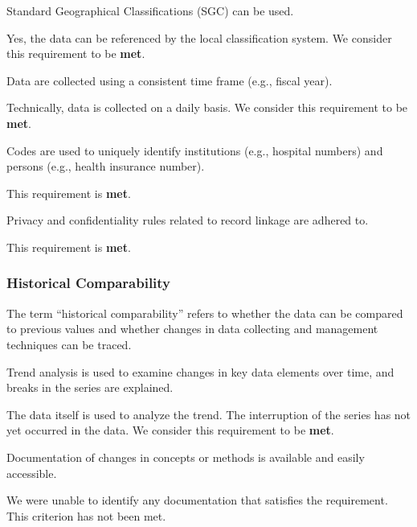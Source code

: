 \begin{QandA}
    \item Standard Geographical Classifications (SGC) can be used.
    \begin{answered}
        Yes, the data can be referenced by the local classification system.
        We consider this requirement to be \textbf{met}.
    \end{answered}

    \item Data are collected using a consistent time frame (e.g., fiscal year).
    \begin{answered}
        Technically, data is collected on a daily basis.
        We consider this requirement to be \textbf{met}.
    \end{answered}

    \item Codes are used to uniquely identify institutions (e.g., hospital numbers) and persons (e.g., health insurance number).
    \begin{answered}
        This requirement is \textbf{met}.
    \end{answered}

    \item Privacy and confidentiality rules related to record linkage are adhered to.
    \begin{answered}
        This requirement is \textbf{met}.
    \end{answered}

\end{QandA}

\subsubsection{Historical Comparability}

The term \enquote{historical comparability} refers to whether the data can be compared to previous values and whether changes in data collecting and management techniques can be traced.

\begin{QandA}
    \item Trend analysis is used to examine changes in key data elements over time, and breaks in the series are explained.
    \begin{answered}
        The data itself is used to analyze the trend.
        The interruption of the series has not yet occurred in the data.
        We consider this requirement to be \textbf{met}.
    \end{answered}

    \item Documentation of changes in concepts or methods is available and easily accessible.
    \begin{answered}
        We were unable to identify any documentation that satisfies the requirement.
        This criterion has not been met.
    \end{answered}

\end{QandA}

